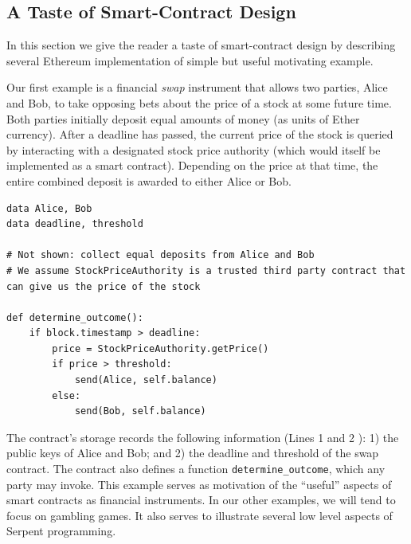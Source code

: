 \documentclass[10pt,twocolumn,letterpaper]{article}
\newcommand{\elaine}[1]{{\color{red}{[elaine: #1]}}}
\begin{document}
\subsection{A Taste of Smart-Contract Design}

In this section we give the reader a taste of smart-contract design by describing several Ethereum implementation of simple but useful motivating example. 

Our first example is a financial \emph{swap} instrument that allows two parties, Alice and Bob, to take opposing bets about the price of a stock at some future time. Both parties initially deposit equal amounts of money (as units of Ether currency). After a deadline has passed, the current price of the stock is queried by interacting with a designated stock price authority (which would itself be implemented as a smart contract). Depending on the price at that time, the entire combined deposit is awarded to either Alice or Bob.

\begin{mdframed}
\begin{verbatim}
data Alice, Bob
data deadline, threshold

# Not shown: collect equal deposits from Alice and Bob
# We assume StockPriceAuthority is a trusted third party contract that can give us the price of the stock

def determine_outcome():
    if block.timestamp > deadline: 
        price = StockPriceAuthority.getPrice()
        if price > threshold:
            send(Alice, self.balance)
        else:
            send(Bob, self.balance)
\end{verbatim}
\end{mdframed}

The contract's storage 
records  the following information (Lines 1 and 2 \elaine{hard coded}): 
1) the public keys of Alice and Bob;
and 2) the deadline and threshold 
of the swap contract.
The contract also defines 
a function \texttt{determine\_outcome}, which any party may invoke.
This example serves as motivation of the ``useful'' aspects of smart contracts as financial instruments. In our other examples, we will tend to focus on gambling games. It also serves to illustrate several low level aspects of Serpent programming.
\end{document}
